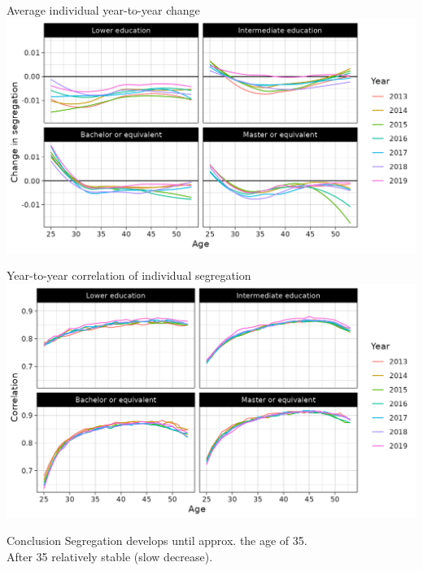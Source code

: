 \documentclass[aspectratio=169]{beamer}
\begin{document}
\begin{frame}{Average individual year-to-year change}
\includegraphics[width=0.79\paperwidth]{figures/segregatie_ontwikkeling_leeftijd.png}
\end{frame}

\begin{frame}{Year-to-year correlation of individual segregation}
\includegraphics[width=0.79\paperwidth]{figures/correlation.png}
\end{frame}



\invert
\begin{frame}{Conclusion}
  Segregation develops until approx. the age of 35.\\[2em]

  After 35 relatively stable (slow decrease).\\[2em]

\end{frame}
\end{document}
